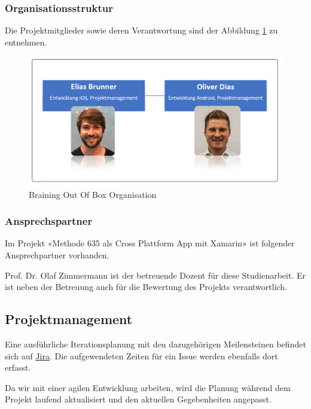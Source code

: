 \subsubsection*{Organisationsstruktur}
Die Projektmitglieder sowie deren Verantwortung sind der Abbildung \ref{fig:organisation} zu entnehmen.
\begin{figure}[h]
	\centering
	\includegraphics[width=1\linewidth]{img/projekt-plan/organisation}
	\caption[Organisation BrainingOutOfBox]{Braining Out Of Box Organisation}
	\label{fig:organisation}
\end{figure}



\subsubsection*{Ansprechspartner}
Im Projekt «Methode 635 als Cross Plattform App mit Xamarin» ist folgender Ansprechpartner vorhanden.

\begin{description}[leftmargin=!,labelwidth=\widthof{\bfseries Dozent}]
	\item[Dozent] Prof. Dr. Olaf Zimmermann ist der betreuende Dozent für diese Studienarbeit. Er ist neben der Betreuung auch für die Bewertung des Projekts verantwortlich. 
\end{description}

\subsection{Projektmanagement}
Eine ausführliche Iterationsplanung mit den dazugehörigen Meilensteinen befindet sich auf \href{https://hsr-sa.atlassian.net/}{Jira}. Die aufgewendeten Zeiten für ein Issue werden ebenfalls dort erfasst.


Da wir mit einer agilen Entwicklung arbeiten, wird die Planung während dem Projekt laufend aktualisiert und den aktuellen Gegebenheiten angepasst. 


